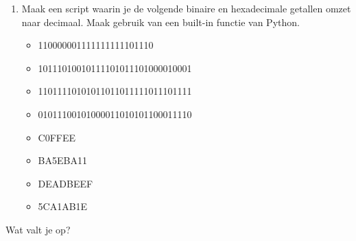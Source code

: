 \begin{enumerate}
\item Maak een script waarin je de volgende binaire en hexadecimale getallen omzet naar decimaal. Maak gebruik van een built-in functie van Python. 
	\begin{itemize}
	\item 110000001111111111101110
	\item 10111010010111101011101000010001
	\item 11011110101011011011111011101111
	\item 01011100101000011010101100011110
	\end{itemize}

	\begin{itemize}
	\item C0FFEE
	\item BA5EBA11
	\item DEADBEEF
	\item 5CA1AB1E
	\end{itemize}
\end{enumerate}
Wat valt je op?

